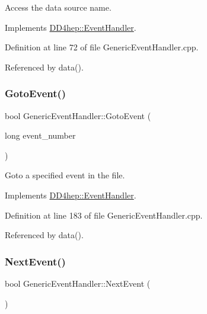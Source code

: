 Access the data source name. 



Implements \hyperlink{class_d_d4hep_1_1_event_handler_a5fa231363a787ba7edf520b5a99f294e}{D\+D4hep\+::\+Event\+Handler}.



Definition at line 72 of file Generic\+Event\+Handler.\+cpp.



Referenced by data().

\hypertarget{class_d_d4hep_1_1_generic_event_handler_a7a7c4d1592e5b2d467a426058aa1a44b}{}\label{class_d_d4hep_1_1_generic_event_handler_a7a7c4d1592e5b2d467a426058aa1a44b} 
\subsubsection{\texorpdfstring{Goto\+Event()}{GotoEvent()}}
{\footnotesize\ttfamily bool Generic\+Event\+Handler\+::\+Goto\+Event (\begin{DoxyParamCaption}\item[{long}]{event\+\_\+number }\end{DoxyParamCaption})\hspace{0.3cm}{\ttfamily [virtual]}}



Goto a specified event in the file. 



Implements \hyperlink{class_d_d4hep_1_1_event_handler_a09c40b0b753455c1e3df7c561ff6b069}{D\+D4hep\+::\+Event\+Handler}.



Definition at line 183 of file Generic\+Event\+Handler.\+cpp.



Referenced by data().

\hypertarget{class_d_d4hep_1_1_generic_event_handler_a0dc8d4d5dde63d3278f67da79e86b590}{}\label{class_d_d4hep_1_1_generic_event_handler_a0dc8d4d5dde63d3278f67da79e86b590} 
\subsubsection{\texorpdfstring{Next\+Event()}{NextEvent()}}
{\footnotesize\ttfamily bool Generic\+Event\+Handler\+::\+Next\+Event (\begin{DoxyParamCaption}{ }\end{DoxyParamCaption})\hspace{0.3cm}{\ttfamily [virtual]}}



